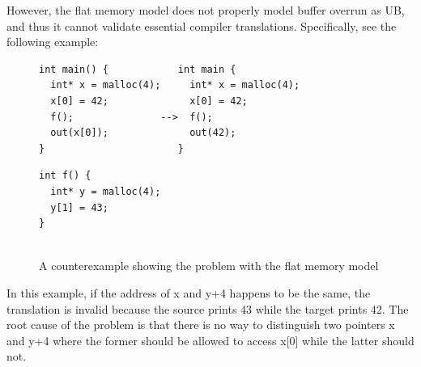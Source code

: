 However, the flat memory model does not properly model buffer overrun as UB, and thus it cannot validate essential compiler translations.
Specifically, see the following example:
\begin{figure}[h]
\begin{minipage}{1.2\linewidth}
\begin{minipage}{0.60\linewidth}
\begin{Verbatim}[frame=single]
int main() {            int main {
  int* x = malloc(4);     int* x = malloc(4);
  x[0] = 42;              x[0] = 42;
  f();               -->  f();
  out(x[0]);              out(42);
}                       }
\end{Verbatim}
\end{minipage}
\hspace*{-2.7mm}
\begin{minipage}{0.3\linewidth}
\begin{Verbatim}[frame=single]
int f() {
  int* y = malloc(4);
  y[1] = 43;
}


\end{Verbatim}
\end{minipage}
\end{minipage}
\caption{A counterexample showing the problem with the flat memory model}
\label{fig:flat-model}
\end{figure}

\noindent In this example, if the address of x and y+4 happens to be the same, the translation is invalid because the source prints 43 while the target prints 42.
The root cause of the problem is that there is no way to distinguish two pointers x and y+4 where the former should be allowed to access x[0] while the latter should not.


